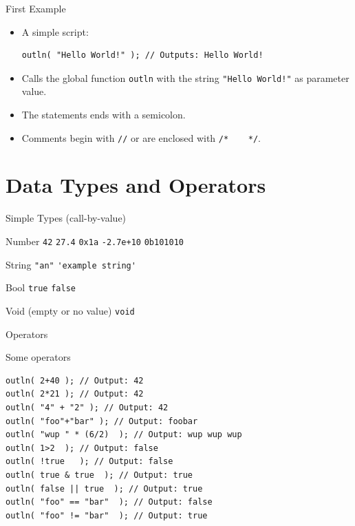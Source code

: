 \documentclass[ucs,9pt]{beamer}
\begin{document}
\begin{frame}[fragile]{First Example}
\begin{itemize}
	\addtolength{\itemsep}{\baselineskip}
	\item A simple script:
	\small
			\begin{lstlisting}
outln( "Hello World!" ); // Outputs: Hello World!
			\end{lstlisting}
	\normalsize
	\pause
		\item Calls the global function \lstinline!outln! with the string  \lstinline{"Hello World!"}  as parameter value.
		\item The statements ends with a semicolon.
		\item Comments begin with  \lstinline{//}  or are enclosed with \lstinline{/*    */}.
\end{itemize}
\end{frame}


\section{Data Types and Operators}
\begin{frame}[fragile]{Simple Types (call-by-value)}
	\begin{block}{Number}
		\hfill \lstinline!42! \hfill \lstinline!27.4! \hfill \lstinline!0x1a! \hfill \lstinline!-2.7e+10! \hfill \lstinline!0b101010! \hfill{}
	\end{block}
	\begin{block}{String}
		\hfill \lstinline!"an"! \hfill \lstinline!'example string'!  \hfill{}
	\end{block}
	\begin{block}{Bool}
		\hfill \lstinline!true! \hfill \lstinline!false! \hfill{}
	\end{block}
	\begin{block}{Void (empty or no value)}
		\hfill \lstinline!void! \hfill{}
	\end{block}
\end{frame}

\begin{frame}[fragile]{Operators}
	\begin{block}{Some operators}
\begin{lstlisting}
outln( 2+40 ); // Output: 42
outln( 2*21 ); // Output: 42
outln( "4" + "2" ); // Output: 42
outln( "foo"+"bar" ); // Output: foobar
outln( "wup " * (6/2)  ); // Output: wup wup wup
outln( 1>2  ); // Output: false
outln( !true   ); // Output: false
outln( true & true  ); // Output: true
outln( false || true  ); // Output: true
outln( "foo" == "bar"  ); // Output: false
outln( "foo" != "bar"  ); // Output: true
\end{lstlisting}
	\end{block}
\end{frame}
	
\end{document}
